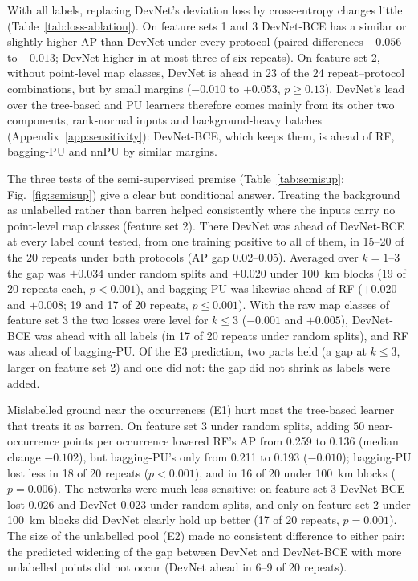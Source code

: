\documentclass[pdflatex,sn-apa]{sn-jnl}
\begin{document}
With all labels, replacing DevNet's deviation loss by cross-entropy changes little (Table~\ref{tab:loss-ablation}). On feature sets 1 and 3 DevNet-BCE has a similar or slightly higher AP than DevNet under every protocol (paired differences $-0.056$ to $-0.013$; DevNet higher in at most three of six repeats). On feature set 2, without point-level map classes, DevNet is ahead in 23 of the 24 repeat--protocol combinations, but by small margins ($-0.010$ to $+0.053$, $p \geq 0.13$). DevNet's lead over the tree-based and PU learners therefore comes mainly from its other two components, rank-normal inputs and background-heavy batches (Appendix~\ref{app:sensitivity}): DevNet-BCE, which keeps them, is ahead of RF, bagging-PU and nnPU by similar margins.

The three tests of the semi-supervised premise (Table~\ref{tab:semisup}; Fig.~\ref{fig:semisup}) give a clear but conditional answer. Treating the background as unlabelled rather than barren helped consistently where the inputs carry no point-level map classes (feature set 2). There DevNet was ahead of DevNet-BCE at every label count tested, from one training positive to all of them, in 15--20 of the 20 repeats under both protocols (AP gap 0.02--0.05). Averaged over $k = 1$--3 the gap was $+0.034$ under random splits and $+0.020$ under 100~km blocks (19 of 20 repeats each, $p < 0.001$), and bagging-PU was likewise ahead of RF ($+0.020$ and $+0.008$; 19 and 17 of 20 repeats, $p \leq 0.001$). With the raw map classes of feature set 3 the two losses were level for $k \leq 3$ ($-0.001$ and $+0.005$), DevNet-BCE was ahead with all labels (in 17 of 20 repeats under random splits), and RF was ahead of bagging-PU. Of the E3 prediction, two parts held (a gap at $k \leq 3$, larger on feature set 2) and one did not: the gap did not shrink as labels were added.

Mislabelled ground near the occurrences (E1) hurt most the tree-based learner that treats it as barren. On feature set 3 under random splits, adding 50 near-occurrence points per occurrence lowered RF's AP from 0.259 to 0.136 (median change $-0.102$), but bagging-PU's only from 0.211 to 0.193 ($-0.010$); bagging-PU lost less in 18 of 20 repeats ($p < 0.001$), and in 16 of 20 under 100~km blocks ($p = 0.006$). The networks were much less sensitive: on feature set 3 DevNet-BCE lost 0.026 and DevNet 0.023 under random splits, and only on feature set 2 under 100~km blocks did DevNet clearly hold up better (17 of 20 repeats, $p = 0.001$). The size of the unlabelled pool (E2) made no consistent difference to either pair: the predicted widening of the gap between DevNet and DevNet-BCE with more unlabelled points did not occur (DevNet ahead in 6--9 of 20 repeats).
\end{document}
